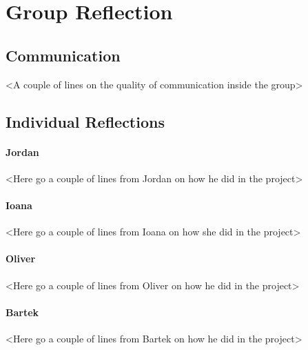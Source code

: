 \documentclass[11pt]{article}
\begin{document}
\section{Group Reflection}
\subsection*{Communication}
<A couple of lines on the quality of communication inside the group>
\subsection*{Individual Reflections}
\paragraph*{Jordan}
<Here go a couple of lines from Jordan on how he did in the project>
\paragraph*{Ioana}
<Here go a couple of lines from Ioana on how she did in the project>
\paragraph*{Oliver}
<Here go a couple of lines from Oliver on how he did in the project>
\paragraph*{Bartek}
<Here go a couple of lines from Bartek on how he did in the project>
\end{document}
